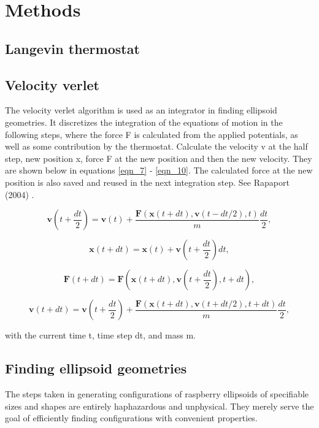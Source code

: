 \documentclass[12pt, DIV=12]{scrartcl}
\begin{document}
\section{Methods}

\subsection{Langevin thermostat}

\subsection{Velocity verlet}

The velocity verlet algorithm is used as an integrator in finding ellipsoid geometries. It discretizes the integration of the equations of motion in the following steps, where the force F is calculated from the applied potentials, as well as some contribution by the thermostat. Calculate the velocity v at the half step, new position x, force F at the new position and then the new velocity. They are shown below in equations \ref{eqn_7} - \ref{eqn_10}. The calculated force at the new position is also saved and reused in the next integration step. See Rapaport (2004) \cite{Rapaport2004}.

\begin{equation}
    \mathbf{v}(t + \frac{d t}{2}) = \mathbf{v}(t) + \frac{\mathbf{F}(\mathbf{x}(t + d t), \mathbf{v}(t - d t/2),t)}{m}\frac{d t}{2},
    \label{eqn_7}
\end{equation}

\begin{equation}
    \mathbf{x}(t + d t) = \mathbf{x}(t) + \mathbf{v}(t + \frac{d t}{2}) dt,
    \label{eqn_8}
\end{equation}

\begin{equation}
    \mathbf{F}(t + d t) = \mathbf{F}(\mathbf{x}(t + d t), \mathbf{v}(t + \frac{dt}{2}),t + d t),
    \label{eqn_9}
\end{equation}

\begin{equation}
    \mathbf{v}(t + d t) = \mathbf{v}(t + \frac{d t}{2}) + \frac{\mathbf{F}(\mathbf{x}(t + d t), \mathbf{v}(t + d t/2), t + dt)}{m}\frac{d t}{2},
    \label{eqn_10}
\end{equation}

with the current time t, time step dt, and mass m.

\subsection{Finding ellipsoid geometries}
The steps taken in generating configurations of raspberry ellipsoids of specifiable sizes and shapes are entirely haphazardous and unphysical. They merely serve the goal of efficiently finding configurations with convenient properties.
\end{document}
